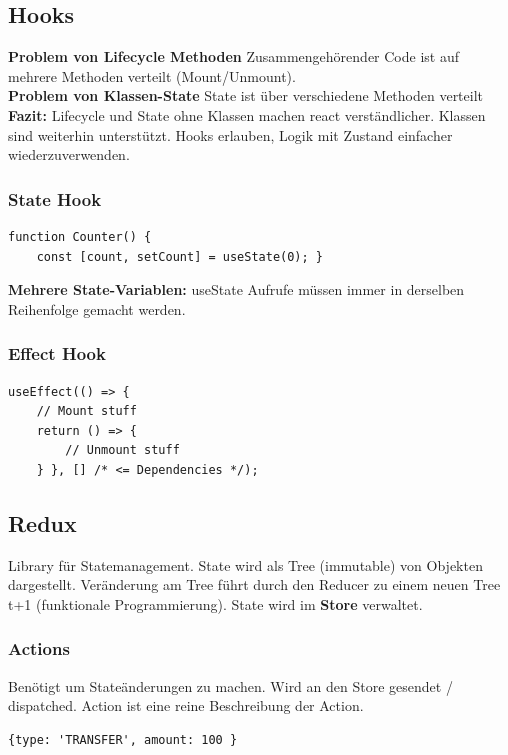 \subsection{Hooks}
\textbf{Problem von Lifecycle Methoden}
Zusammengehörender Code ist auf mehrere Methoden verteilt (Mount/Unmount).\\
\textbf{Problem von Klassen-State}
State ist über verschiedene Methoden verteilt\\
\textbf{Fazit:} Lifecycle und State ohne Klassen machen react verständlicher.
Klassen sind weiterhin unterstützt.
Hooks erlauben, Logik mit Zustand einfacher wiederzuverwenden.

\subsubsection{State Hook}
\begin{lstlisting}
function Counter() {
    const [count, setCount] = useState(0); }
\end{lstlisting}
\textbf{Mehrere State-Variablen:} useState Aufrufe müssen immer in derselben Reihenfolge gemacht werden.

\subsubsection{Effect Hook}
\begin{lstlisting}
useEffect(() => {
    // Mount stuff
    return () => {
        // Unmount stuff
    } }, [] /* <= Dependencies */);
\end{lstlisting}

\subsection{Redux}
Library für Statemanagement.
State wird als Tree (immutable) von Objekten dargestellt.
Veränderung am Tree führt durch den Reducer zu einem neuen Tree t+1 (funktionale Programmierung).
State wird im \textbf{Store} verwaltet.

\subsubsection{Actions}
Benötigt um Stateänderungen zu machen.
Wird an den Store gesendet / dispatched.
Action ist eine reine Beschreibung der Action.
\begin{lstlisting}
{type: 'TRANSFER', amount: 100 }
\end{lstlisting}

